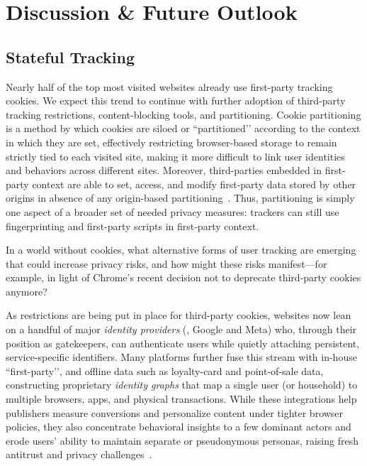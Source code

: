\section{Discussion \& Future Outlook}
\label{sec:future-outlook}

\subsection{Stateful Tracking}
Nearly half of the top most visited websites already use first-party tracking cookies. We expect this trend to continue with further adoption of third-party tracking restrictions, content-blocking tools, and partitioning.
%
Cookie partitioning is a method by which cookies are siloed or ``partitioned’’ according to the context in which they are set, effectively restricting browser-based storage to remain strictly tied to each visited site, making it more difficult to link user identities and behaviors across different sites.
%
Moreover, third-parties embedded in first-party context are able to set, access, and modify first-party data stored by other origins in absence of any origin-based partitioning~\cite{bahramiCOOKIEGUARDCharacterizingIsolating2024}.
%
Thus, partitioning is simply one aspect of a broader set of needed privacy measures: trackers can still use fingerprinting and first-party scripts in first-party context. %

\begin{opbox}
In a world without cookies, what alternative forms of user tracking are emerging that could increase privacy risks, and how might these risks manifest---for example, in light of Chrome’s recent decision not to deprecate third-party cookies anymore?
\end{opbox}


\label{sec:id-providers}
As restrictions are being put in place for third-party cookies, websites now lean on a handful of major \emph{identity providers} (\eg{}, Google and Meta) who, through their position as gatekeepers, can authenticate users while quietly attaching persistent, service-specific identifiers. 
%
Many platforms further fuse this stream with in-house ``first-party’’, and offline data such as loyalty-card and point-of-sale data, constructing proprietary \emph{identity graphs} that map a single user (or household) to multiple browsers, apps, and physical transactions.
%
While these integrations help publishers measure conversions and personalize content under tighter browser policies, they also concentrate behavioral insights to a few dominant actors and erode users’ ability to maintain separate or pseudonymous personas, raising fresh antitrust and privacy challenges~\cite{TargetedAdvertisingAutorite2025,khanAmazonsAntitrustParadox2017,munirGooglesChromeAntitrust2024}.
%

